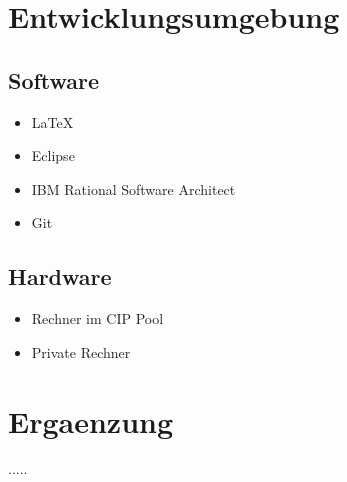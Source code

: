 \documentclass{article}
\begin{document}
\section{Entwicklungsumgebung}
\subsection{Software}
\begin{itemize}
	\item LaTeX
	\item Eclipse
	\item IBM Rational Software Architect
	\item Git
\end{itemize}

\subsection{Hardware}
\begin{itemize}
	\item Rechner im CIP Pool	
	\item Private Rechner
\end{itemize}

\section{Ergaenzung}
..... 
\newpage
\printglossaries
\end{document}
